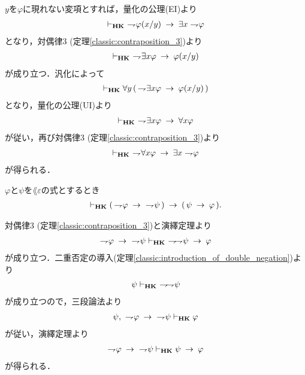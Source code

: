 	\begin{sketch}
		$y$を$\varphi$に現れない変項とすれば，量化の公理(EI)より
		\begin{align}
			\vdash_{{\scriptsize \mbox{{\bf HK}}}}\ \rightharpoondown\hspace{-0.25em} \varphi(x/y) \hspace{0.25em}\rightarrow\hspace{0.25em} \exists x \rightharpoondown\hspace{-0.25em} \varphi
		\end{align}
		となり，対偶律3 (定理\ref{classic:contraposition_3})より
		\begin{align}
			\provable{\mbox{{\bf HK}}}\ 
			\negation \exists x \varphi \rarrow \varphi(x/y)
		\end{align}
		が成り立つ．汎化によって
		\begin{align}
			\vdash_{{\scriptsize \mbox{{\bf HK}}}}
			\forall y\, (\, \rightharpoondown\hspace{-0.25em} \exists x \varphi \hspace{0.25em}\rightarrow\hspace{0.25em} \varphi(x/y)\, )
		\end{align}
		となり，量化の公理(UI)より
		\begin{align}
			\provable{\mbox{{\bf HK}}}\ 
			\negation \exists x \varphi \rarrow \forall x \varphi
		\end{align}
		が従い，再び対偶律3 (定理\ref{classic:contraposition_3})より
		\begin{align}
			\vdash_{{\scriptsize \mbox{{\bf HK}}}}\ \rightharpoondown\hspace{-0.25em} \forall x \varphi \hspace{0.25em}\rightarrow\hspace{0.25em} \exists x \rightharpoondown\hspace{-0.25em} \varphi
		\end{align}
		が得られる．
		\QED
	\end{sketch}
	
	\begin{screen}
		\begin{thm}[対偶律4]\label{classic:contraposition_4}
			$\varphi$と$\psi$を$\lang{\varepsilon}$の式とするとき
			\begin{align}
				\vdash_{{\scriptsize \mbox{{\bf HK}}}} (\, \rightharpoondown\hspace{-0.25em} \varphi \hspace{0.25em}\rightarrow\hspace{0.25em}\ \rightharpoondown\hspace{-0.25em} \psi\, )
				\hspace{0.25em}\rightarrow\hspace{0.25em} (\, \psi \hspace{0.25em}\rightarrow\hspace{0.25em} \varphi\, ).
			\end{align}
		\end{thm}
	\end{screen}
	
	\begin{sketch}
		対偶律3 (定理\ref{classic:contraposition_3})と演繹定理より
		\begin{align}
			\negation \varphi \rarrow\ \negation \psi \provable{\mbox{{\bf HK}}}\ 
			\negation \negation \psi \rarrow \varphi
		\end{align}
		が成り立つ．二重否定の導入(定理\ref{classic:introduction_of_double_negation})より
		\begin{align}
			\psi \vdash_{{\scriptsize \mbox{{\bf HK}}}}\ \rightharpoondown\hspace{-0.25em} \rightharpoondown\hspace{-0.25em} \psi
		\end{align}
		が成り立つので，三段論法より
		\begin{align}
			\psi,\ \rightharpoondown\hspace{-0.25em} \varphi \hspace{0.25em}\rightarrow\hspace{0.25em}\ \rightharpoondown\hspace{-0.25em} \psi \vdash_{{\scriptsize \mbox{{\bf HK}}}} \varphi
		\end{align}
		が従い，演繹定理より
		\begin{align}
			\rightharpoondown\hspace{-0.25em} \varphi \hspace{0.25em}\rightarrow\hspace{0.25em}\ \rightharpoondown\hspace{-0.25em} \psi \vdash_{{\scriptsize \mbox{{\bf HK}}}} 
			\psi \hspace{0.25em}\rightarrow\hspace{0.25em} \varphi
		\end{align}
		が得られる．
		\QED
	\end{sketch}
	
